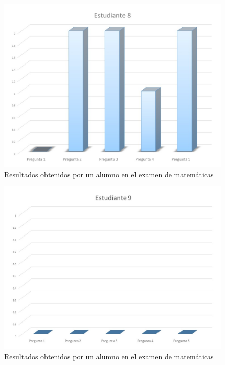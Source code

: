 \documentclass[12pt] {report}
\begin{document}
\begin{figure}[H]
\centering 
\includegraphics[scale=.7]{MEstudiante8.JPG}
\caption{Resultados obtenidos por un alumno en el examen de matemáticas}
\end{figure}
\begin{figure}[H]
\centering 
\includegraphics[scale=.7]{MEstudiante9.JPG}
\caption{Resultados obtenidos por un alumno en el examen de matemáticas}
\end{figure}
\end{document}
